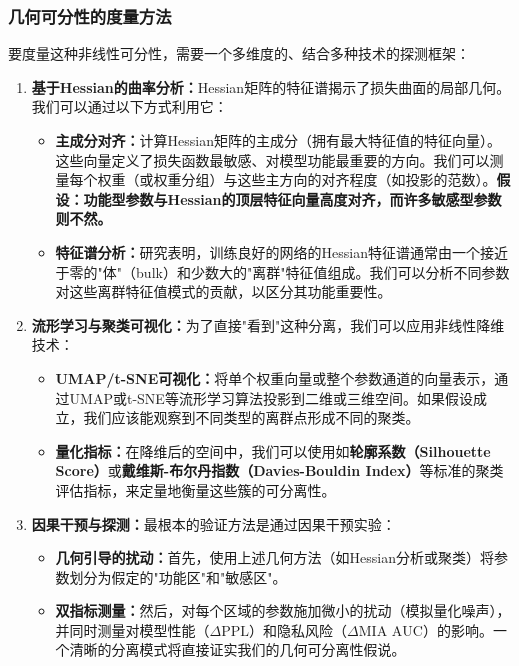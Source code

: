 \documentclass[letterpaper,twocolumn,10pt]{article}
\begin{document}
\subsubsection{几何可分性的度量方法}

要度量这种非线性可分性，需要一个多维度的、结合多种技术的探测框架：

\begin{enumerate}
\item \textbf{基于Hessian的曲率分析：}Hessian矩阵的特征谱揭示了损失曲面的局部几何。我们可以通过以下方式利用它：
\begin{itemize}
\item \textbf{主成分对齐：}计算Hessian矩阵的主成分（拥有最大特征值的特征向量）。这些向量定义了损失函数最敏感、对模型功能最重要的方向。我们可以测量每个权重（或权重分组）与这些主方向的对齐程度（如投影的范数）。\textbf{假设：功能型参数与Hessian的顶层特征向量高度对齐，而许多敏感型参数则不然。}

\item \textbf{特征谱分析：}研究表明，训练良好的网络的Hessian特征谱通常由一个接近于零的"体"（bulk）和少数大的"离群"特征值组成。我们可以分析不同参数对这些离群特征值模式的贡献，以区分其功能重要性。
\end{itemize}

\item \textbf{流形学习与聚类可视化：}为了直接"看到"这种分离，我们可以应用非线性降维技术：
\begin{itemize}
\item \textbf{UMAP/t-SNE可视化：}将单个权重向量或整个参数通道的向量表示，通过UMAP或t-SNE等流形学习算法投影到二维或三维空间。如果假设成立，我们应该能观察到不同类型的离群点形成不同的聚类。

\item \textbf{量化指标：}在降维后的空间中，我们可以使用如\textbf{轮廓系数（Silhouette Score）}或\textbf{戴维斯-布尔丹指数（Davies-Bouldin Index）}等标准的聚类评估指标，来定量地衡量这些簇的可分离性。
\end{itemize}

\item \textbf{因果干预与探测：}最根本的验证方法是通过因果干预实验：
\begin{itemize}
\item \textbf{几何引导的扰动：}首先，使用上述几何方法（如Hessian分析或聚类）将参数划分为假定的"功能区"和"敏感区"。

\item \textbf{双指标测量：}然后，对每个区域的参数施加微小的扰动（模拟量化噪声），并同时测量对模型性能（$\Delta \text{PPL}$）和隐私风险（$\Delta \text{MIA AUC}$）的影响。一个清晰的分离模式将直接证实我们的几何可分离性假说。
\end{itemize}
\end{enumerate}
\end{document}
